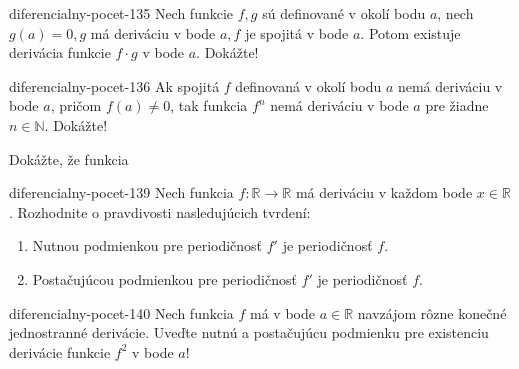 \begin{defproblem}{diferencialny-pocet-135}
Nech funkcie $f,g$ sú definované v okolí bodu $a$, nech $g(a)=0,g$ má deriváciu v bode $a,f$ je spojitá v bode $a$. Potom existuje derivácia funkcie $f\cdot g$ v bode $a$. Dokážte!
\end{defproblem}

\begin{defproblem}{diferencialny-pocet-136}
Ak spojitá $f$ definovaná v okolí bodu $a$ nemá deriváciu v bode $a$, pričom $f(a)\neq 0$, tak funkcia $f^{n}$ nemá deriváciu v bode $a$ pre žiadne $n\in\mathbb{N}$. Dokážte!
\end{defproblem}

Dokážte, že funkcia


\begin{defproblem}{diferencialny-pocet-139}
Nech funkcia $f:\mathbb{R}\rightarrow\mathbb{R}$ má deriváciu v každom bode $x\in\mathbb{R}$. Rozhodnite o pravdivosti nasledujúcich tvrdení:
\begin{enumerate}
\item Nutnou podmienkou pre periodičnosť $f'$ je periodičnosť $f$.
\item Postačujúcou podmienkou pre periodičnosť $f'$ je periodičnosť $f$.
\end{enumerate}
\end{defproblem}

\begin{defproblem}{diferencialny-pocet-140}
Nech funkcia $f$ má v bode $a\in\mathbb{R}$ navzájom rôzne konečné jednostranné derivácie. Uveďte nutnú a postačujúcu podmienku pre existenciu derivácie funkcie $f^2$ v bode $a$!
\end{defproblem}

